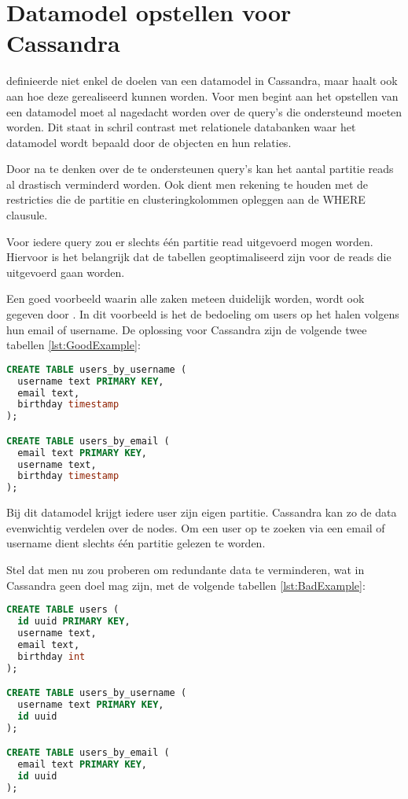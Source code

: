 \section{Datamodel opstellen voor Cassandra}
\cite{Hobbs2015Datamodelling} definieerde niet enkel de doelen van een datamodel in Cassandra, maar haalt ook aan hoe deze gerealiseerd kunnen worden.
Voor men begint aan het opstellen van een datamodel moet al nagedacht worden over de query's die ondersteund moeten worden.
Dit staat in schril contrast met relationele databanken waar het datamodel wordt bepaald door de objecten en hun relaties.

Door na te denken over de te ondersteunen query's kan het aantal partitie reads al drastisch verminderd worden.
Ook dient men rekening te houden met de restricties die de partitie en clusteringkolommen opleggen aan de WHERE clausule.

Voor iedere query zou er slechts één partitie read uitgevoerd mogen worden.
Hiervoor is het belangrijk dat de tabellen geoptimaliseerd zijn voor de reads die uitgevoerd gaan worden.

Een goed voorbeeld waarin alle zaken meteen duidelijk worden, wordt ook gegeven door \cite{Hobbs2015Datamodelling} .
In dit voorbeeld is het de bedoeling om users op het halen volgens hun email of username.
De oplossing voor Cassandra zijn de volgende twee tabellen \ref{lst:GoodExample}:

\begin{lstlisting}[caption={Correcte datamodellering bij Cassandra},label={lst:GoodExample}, language=SQL]
CREATE TABLE users_by_username (
  username text PRIMARY KEY,
  email text,
  birthday timestamp
);

CREATE TABLE users_by_email (
  email text PRIMARY KEY,
  username text,
  birthday timestamp
);
\end{lstlisting}

Bij dit datamodel krijgt iedere user zijn eigen partitie.
Cassandra kan zo de data evenwichtig verdelen over de nodes.
Om een user op te zoeken via een email of username dient slechts één partitie gelezen te worden.

Stel dat men nu zou proberen om redundante data te verminderen, wat in Cassandra geen doel mag zijn, met de volgende tabellen \ref{lst:BadExample}:

\begin{lstlisting}[caption={Foutieve datamodellering bij Cassandra},label={lst:BadExample}, language=SQL]
CREATE TABLE users (
  id uuid PRIMARY KEY,
  username text,
  email text,
  birthday int
);

CREATE TABLE users_by_username (
  username text PRIMARY KEY,
  id uuid
);

CREATE TABLE users_by_email (
  email text PRIMARY KEY,
  id uuid
);
\end{lstlisting}


